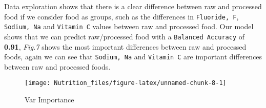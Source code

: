 \documentclass[]{article}
\begin{document}
Data exploration shows that there is a clear difference between raw and
processed food if we consider food as groups, such as the differences in
\texttt{Fluoride,\ F}, \texttt{Sodium,\ Na} and \texttt{Vitamin\ C}
values between raw and processed food. Our model shows that we can
predict raw/processed food with a \texttt{Balanced\ Accuracy} of
\textbf{0.91}, \emph{Fig.7} shows the most important differences between
raw and processed foods, again we can see that \texttt{Sodium,\ Na} and
\texttt{Vitamin\ C} are important differences between raw and processed
foods.

\begin{figure}

{\centering \texttt{[image: Nutrition\_files/figure-latex/unnamed-chunk-8-1]} 

}

\caption{Var Importance}\label{fig:unnamed-chunk-8}
\end{figure}
\end{document}
